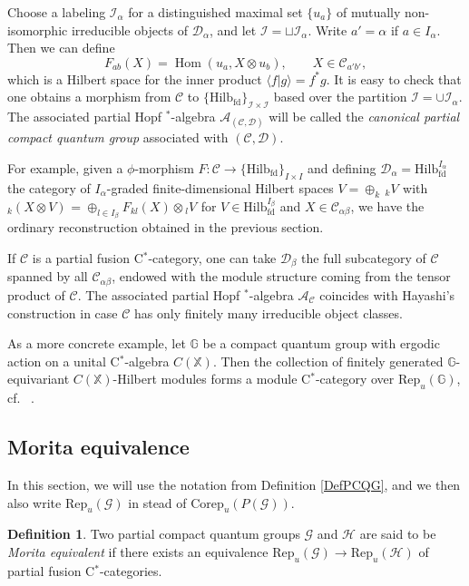 \documentclass[10pt]{article}
\DeclareMathOperator{\fin}{\mathrm{fd}}
\DeclareMathOperator{\Hom}{Hom}
\newcommand{\Corep}{\mathrm{Corep}}
\newcommand{\G}{\mathbb{G}}
\newcommand{\CatC}{\mathcal{C}}
\newcommand{\CatD}{\mathcal{D}}
\newcommand{\CatCC}{\mathscr{C}}
\newcommand{\CatDD}{\mathscr{D}}
\newcommand{\Hilb}{\mathrm{Hilb}}
\newcommand{\Rep}{\mathrm{Rep}}
\newcommand{\GrDA}[3]{{}_{#2}#1_{#3}} %
\theoremstyle{definition}
\newtheorem{Def}[Theorem]{Definition}
\numberwithin{equation}{section}
\begin{document}
Choose a labeling $\mathcal{I}_{\alpha}$ for a distinguished maximal set $\{u_a\}$ of mutually non-isomorphic irreducible objects of $\CatD_{\alpha}$, and let $\mathcal{I} = \sqcup \mathcal{I}_{\alpha}$. Write $a' = \alpha$ if $a\in I_{\alpha}$. Then we can define \[F_{ab}(X)  = \Hom(u_a,  X\otimes u_b),\qquad X\in \CatC_{a'b'},\] which is a Hilbert space for the inner product $\langle f| g \rangle = f^*g$. It is easy to check that one obtains a morphism from $\CatCC$ to $\{\Hilb_{\fin}\}_{\mathcal{I}\times \mathcal{I}}$ based over the partition $\mathcal{I} = \cup \mathcal{I}_{\alpha}$. The associated partial Hopf $^*$-algebra $\mathscr{A}_{(\CatCC,\CatDD)}$ will be called the \emph{canonical partial compact quantum group} associated with $(\CatCC,\CatDD)$. 

For example, given a $\phi$-morphism $F:\CatCC \rightarrow  \{\Hilb_{\fin}\}_{I\times I}$ and defining $\CatDD_{\alpha} =\Hilb_{\fin}^{I_{\alpha}}$ the category of $I_{\alpha}$-graded finite-dimensional Hilbert spaces $V = \oplus_k\, \GrDA{V}{k}{}$ with $\GrDA{\left(X\otimes V\right)}{k}{} = \oplus_{l\in I_{\beta}} F_{kl}(X)\otimes \GrDA{V}{l}{}$ for $V\in \Hilb_{\fin}^{I_{\beta}}$ and $X\in \CatC_{\alpha\beta}$, we have the ordinary reconstruction obtained in the previous section. 

If $\CatCC$ is a partial fusion C$^*$-category, one can take $\CatD_{\beta}$ the full subcategory of $\CatC$ spanned by all $\CatC_{\alpha\beta}$, endowed with the module structure coming from the tensor product of $\CatCC$. The associated partial Hopf $^*$-algebra $\mathscr{A}_{\CatCC}$ coincides with Hayashi's construction \cite{Hay8} in case $\CatCC$ has only finitely many irreducible object classes. 

As a more concrete example, let $\G$ be a compact quantum group with ergodic action on a unital C$^*$-algebra $C(\mathbb{X})$. Then the collection of finitely generated $\G$-equivariant $C(\mathbb{X})$-Hilbert modules forms a module C$^*$-category over $\Rep_u(\G)$, cf.~ \cite{DCY1}. 

\subsection{Morita equivalence}

In this section, we will use the notation from Definition \ref{DefPCQG}, and we then also write $\Rep_u(\mathscr{G})$ in stead of $\Corep_u(P(\mathscr{G}))$.


\begin{Def} Two partial compact quantum groups $\mathscr{G}$ and $\mathscr{H}$ are said to be \emph{Morita equivalent} if there exists an equivalence $\Rep_u(\mathscr{G}) \rightarrow \Rep_u(\mathscr{H})$ of partial fusion C$^*$-categories. 
\end{Def} 
\end{document}

